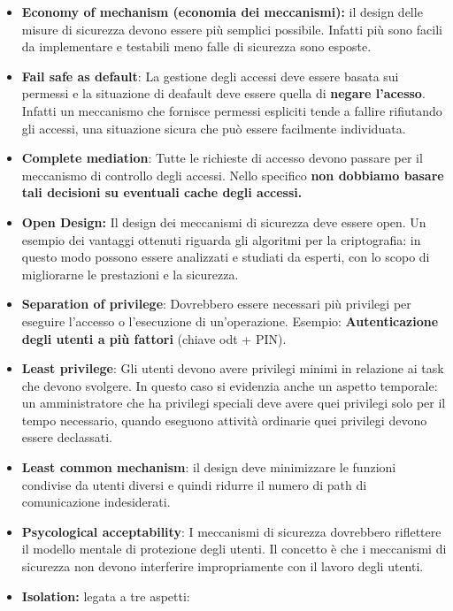 \documentclass[12pt]{article}
\begin{document}
			\begin{itemize}
				\item \textbf{Economy of mechanism (economia dei meccanismi):} il design delle misure di sicurezza devono essere più semplici possibile. Infatti più sono facili da implementare e testabili meno falle di sicurezza sono esposte.
				\item \textbf{Fail safe as default}: La gestione degli accessi deve essere basata sui permessi e la situazione di deafault deve essere quella di \textbf{negare l'acesso}. Infatti un meccanismo che fornisce permessi espliciti tende a fallire rifiutando gli accessi, una situazione sicura che può essere facilmente individuata.
				\item \textbf{Complete mediation}: Tutte le richieste di accesso devono passare per il meccanismo di controllo degli accessi. Nello specifico \textbf{non dobbiamo basare tali decisioni su eventuali cache degli accessi.}  
				\item \textbf{ Open Design:} Il design dei meccanismi di sicurezza deve essere open. Un esempio dei vantaggi ottenuti riguarda gli algoritmi per la criptografia: in questo modo possono essere analizzati e studiati da esperti, con lo scopo di migliorarne le prestazioni e la sicurezza.
				\item \textbf{Separation of privilege}: Dovrebbero essere necessari più privilegi per eseguire l'accesso o l'esecuzione di un'operazione. Esempio: \textbf{Autenticazione degli utenti a più fattori} (chiave odt + PIN). 
				\item \textbf{Least privilege}: Gli utenti devono avere privilegi minimi in relazione ai task che devono svolgere. In questo caso si evidenzia anche un aspetto temporale: un amministratore che ha privilegi speciali deve avere quei privilegi solo per il tempo necessario, quando eseguono attività ordinarie quei privilegi devono essere declassati.
				\item \textbf{Least common mechanism}: il design deve minimizzare le funzioni condivise da utenti diversi e quindi ridurre il numero di path di comunicazione indesiderati.
				\item \textbf{Psycological acceptability}: I meccanismi di sicurezza dovrebbero riflettere il modello mentale di protezione degli utenti. Il concetto è che i meccanismi di sicurezza non devono interferire impropriamente con il lavoro degli utenti.
				\item \textbf{Isolation:} legata a tre aspetti:
				\begin{enumerate}

\end{enumerate}
\end{itemize}
\end{document}
